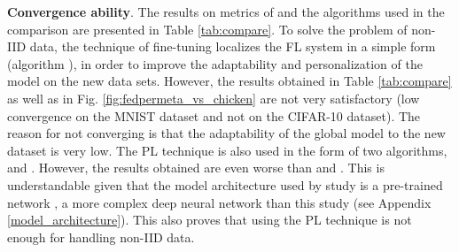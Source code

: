 \documentclass[runningheads]{llncs}
\begin{document}
\textbf{Convergence ability}. The results on metrics of  and the algorithms used in the comparison are presented in Table \ref{tab:compare}. To solve the problem of non-IID data, the technique of fine-tuning localizes the FL system in a simple form (algorithm ), in order to improve the adaptability and personalization of the model on the new data sets. However, the results obtained in Table \ref{tab:compare} as well as in Fig. \ref{fig:fedpermeta_vs_chicken} are not very satisfactory (low convergence on the MNIST dataset and not on the CIFAR-10 dataset). The reason for  not converging is that the adaptability of the global model to the new dataset is very low. The PL technique is also used in the form of two algorithms,  and . However, the results obtained are even worse than  and . This is understandable given that the model architecture used by study \cite{arivazhagan2019federated} is a pre-trained network  \cite{howard2017mobilenets}, a more complex deep neural network than this study (see Appendix \ref{model_architecture}). This also proves that using the PL technique is not enough for handling non-IID data.
\end{document}
